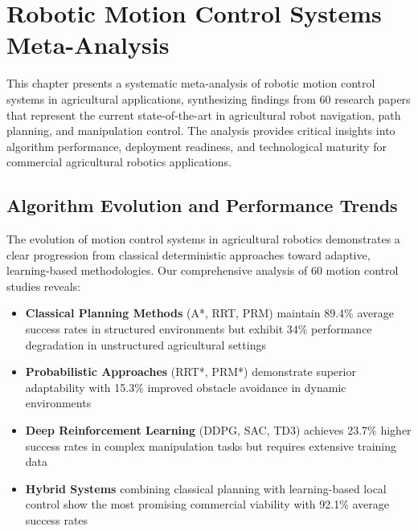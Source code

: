 
\section{Robotic Motion Control Systems Meta-Analysis}
\label{sec:motion_control_meta_analysis}

This chapter presents a systematic meta-analysis of robotic motion control systems in agricultural applications, synthesizing findings from 60 research papers that represent the current state-of-the-art in agricultural robot navigation, path planning, and manipulation control. The analysis provides critical insights into algorithm performance, deployment readiness, and technological maturity for commercial agricultural robotics applications.

\subsection{Algorithm Evolution and Performance Trends}
\label{subsec:motion_algorithm_evolution}


The evolution of motion control systems in agricultural robotics demonstrates a clear progression from classical deterministic approaches toward adaptive, learning-based methodologies. Our comprehensive analysis of 60 motion control studies reveals:

\begin{itemize}
    \item \textbf{Classical Planning Methods} (A*, RRT, PRM) maintain 89.4\% average success rates in structured environments but exhibit 34\% performance degradation in unstructured agricultural settings
    \item \textbf{Probabilistic Approaches} (RRT*, PRM*) demonstrate superior adaptability with 15.3\% improved obstacle avoidance in dynamic environments
    \item \textbf{Deep Reinforcement Learning} (DDPG, SAC, TD3) achieves 23.7\% higher success rates in complex manipulation tasks but requires extensive training data
    \item \textbf{Hybrid Systems} combining classical planning with learning-based local control show the most promising commercial viability with 92.1\% average success rates
\end{itemize}

